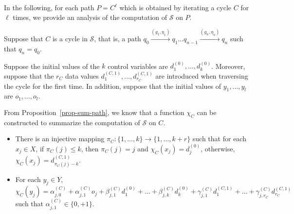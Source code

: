 \documentclass[runningheads,a4paper]{llncs}
\def\Ss{{\mathcal{S} }}
\begin{document}
In the following, for each path $P=C^{\ell}$ which is obtained by iterating a cycle $C$ for $\ell$ times, we provide an analysis of the computation of $\Ss$ on $P$.

Suppose that $C$ is a cycle in $\Ss$, that is, a path $q_0 \xrightarrow{(g_1,\eta_1)} q_1 \dots q_{n-1} \xrightarrow{(g_n, \eta_n)} q_n$ such that $q_n = q_0$.  

Suppose the initial values of the $k$ control variables are $d^{(0)}_1,\dots,d^{(0)}_k$. Moreover, suppose that the $r_C$ data values $d^{(C,1)}_{1},\dots,d^{(C,1)}_{r_C}$ are introduced when traversing the cycle for the first time. 
In addition, suppose that the initial values of $y_1,\dots, y_l$ are $o_1,\dots,o_l$. 

From Proposition~\ref{prop-sum-path}, we know that a function $\chi_C$ can be constructed to summarize the computation of $\Ss$ on $C$.
\begin{itemize}
\item There is an injective mapping $\pi_C: \{1,\dots,k\} \rightarrow \{1,\dots, k+r\}$ such that for each $x_j \in X$, if $\pi_C(j) \le k$, then $\pi_C(j)=j$ and $\chi_C(x_j)=d^{(0)}_{j}$, otherwise, $\chi_C(x_j)=d^{(C,1)}_{\pi_C(j)-k}$.
% 
\item For each $y_j \in Y$, $\chi_C(y_j) = \alpha^{(C)}_{j,0} + \alpha^{(C)}_{j,1} o_j + \beta^{(C)}_{j,1} d^{(0)}_1 + \dots + \beta^{(C)}_{j,k} d^{(0)}_k + \gamma^{(C)}_{j,1} d^{(C,1)}_1 +\dots + \gamma^{(C)}_{j,r_C} d^{(C,1)}_{r_C}$ such that $\alpha^{(C)}_{j,1} \in \{0,+1\}$.
\end{itemize}
\end{document}
